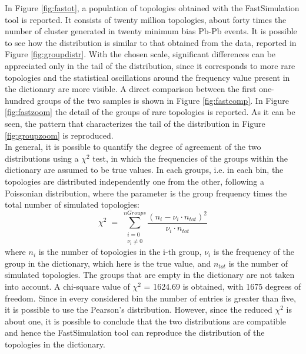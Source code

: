In Figure \ref{fig:fastot}, a population of topologies obtained with the FastSimulation tool is reported. It consists of twenty million topologies, about forty times the number of cluster generated in twenty minimum bias Pb-Pb events. It is possible to see how the distribution is similar to that obtained from the data, reported in Figure \ref{fig:groupdistr}. With the chosen scale, significant differences can be appreciated only in the tail of the distribution, since it corresponds to more rare topologies and the statistical oscillations around the frequency value present in the dictionary are more visible. A direct comparison between the first one-hundred groups of the two samples is shown in Figure \ref{fig:fastcomp}. In Figure \ref{fig:fastzoom} the detail of the groups of rare topologies is reported. As it can be seen, the pattern that characterizes the tail of the distribution in Figure \ref{fig:groupzoom} is reproduced.\\
In general, it is possible to quantify the degree of agreement of the two distributions using a $\chi^2$ test, in which the frequencies of the groups within the dictionary are assumed to be true values. In each groups, i.e. in each bin, the topologies are distributed independently one from the other, following a Poissonian distribution, where the parameter is the group frequency times the total number of simulated topologies:
\begin{equation}
 \chi^2 \; = \; \sum_{\substack{i=0 \\ \nu_i \neq 0}}^{nGroups}\frac{(n_i - \nu_i\cdot n_{tot})^2}{\nu_i\cdot n_{tot}}
\end{equation}
where $n_i$ is the number of topologies in the i-th group, $\nu_i$ is the frequency of the group in the dictionary, which here is the true value, and $n_{tot}$ is the number of simulated topologies. The groups that are empty in the dictionary are not taken into account. A chi-square value of $\chi^2$ = 1624.69 is obtained, with 1675 degrees of freedom. Since in every considered bin the number of entries is greater than five, it is possible to use the Pearson's distribution. However, since the reduced $\chi^2$ is about one, it is possible to conclude that the two distributions are compatible and hence the FastSimulation tool can reproduce the distribution of the topologies in the dictionary.\\
%

